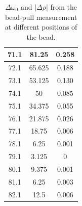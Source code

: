 \documentclass[a4paper]{report}
\numberwithin{equation}{section}
\begin{document}
\begin{table}[!ht]
\begin{tabular}{|c|c|c|}
        71.1 & 81.25 & 0.258 \\ \hline
        72.1 & 65.625 & 0.188 \\ \hline
        73.1 & 53.125 & 0.130 \\ \hline
        74.1 & 50 & 0.085 \\ \hline
        75.1 & 34.375 & 0.055 \\ \hline
        76.1 & 21.875 & 0.026 \\ \hline
        77.1 & 18.75 & 0.006 \\ \hline
        78.1 & 6.25 & 0.001 \\ \hline
        79.1 & 3.125 & 0 \\ \hline
        80.1 & 9.375 & 0.001 \\ \hline
        81.1 & 6.25 & 0.003 \\ \hline
        82.1 & 12.5 & 0.006 \\ \hline
    \end{tabular}
	\caption{$\Delta\omega_0$ and $|\Delta \rho|$ from the bead-pull measurement at different positions of the bead.}
\end{table}

\printbibliography
\end{document}
